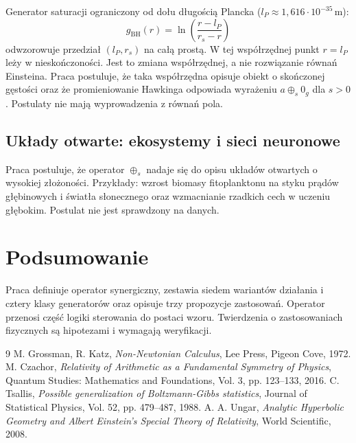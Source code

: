\documentclass[11pt,a4paper]{article}
\theoremstyle{definition}
\theoremstyle{plain}
\begin{document}
Generator saturacji ograniczony od dołu długością Plancka ($l_P \approx 1{,}616 \cdot 10^{-35}\,\mathrm{m}$):
\begin{equation}
g_{\text{BH}}(r) = \ln\left(\frac{r - l_P}{r_s - r}\right)
\end{equation}
odwzorowuje przedział $(l_P, r_s)$ na całą prostą. W tej współrzędnej punkt $r = l_P$ leży w nieskończoności. Jest to zmiana współrzędnej, a nie rozwiązanie równań Einsteina. Praca postuluje, że taka współrzędna opisuje obiekt o skończonej gęstości oraz że promieniowanie Hawkinga odpowiada wyrażeniu $a \oplus_s 0_g$ dla $s > 0$. Postulaty nie mają wyprowadzenia z równań pola.

\subsection{Układy otwarte: ekosystemy i sieci neuronowe}

Praca postuluje, że operator $\oplus_s$ nadaje się do opisu układów otwartych o wysokiej złożoności. Przykłady: wzrost biomasy fitoplanktonu na styku prądów głębinowych i światła słonecznego oraz wzmacnianie rzadkich cech w uczeniu głębokim. Postulat nie jest sprawdzony na danych.

\section{Podsumowanie}

Praca definiuje operator synergiczny, zestawia siedem wariantów działania i cztery klasy generatorów oraz opisuje trzy propozycje zastosowań. Operator przenosi część logiki sterowania do postaci wzoru. Twierdzenia o zastosowaniach fizycznych są hipotezami i wymagają weryfikacji.

\begin{thebibliography}{9}
 M. Grossman, R. Katz, \emph{Non-Newtonian Calculus}, Lee Press, Pigeon Cove, 1972.
 M. Czachor, \emph{Relativity of Arithmetic as a Fundamental Symmetry of Physics}, Quantum Studies: Mathematics and Foundations, Vol. 3, pp. 123--133, 2016.
 C. Tsallis, \emph{Possible generalization of Boltzmann-Gibbs statistics}, Journal of Statistical Physics, Vol. 52, pp. 479--487, 1988.
 A. A. Ungar, \emph{Analytic Hyperbolic Geometry and Albert Einstein's Special Theory of Relativity}, World Scientific, 2008.
\end{thebibliography}
\end{document}
